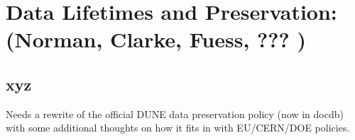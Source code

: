 \chapter{Data Lifetimes and Preservation: (Norman, Clarke, Fuess, ??? )}
\label{ch:pres}

\section{xyz}
\label{sec:pres:xyz} 

Needs a rewrite of the official DUNE data preservation policy (now in docdb) with some additional thoughts on how it fits in with EU/CERN/DOE policies. 